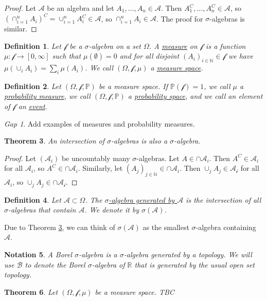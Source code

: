 \documentclass[11pt]{article}
\newcommand{\col}[1]{\mathscr{#1}}
\newcommand{\p}{\mathbb{P}}
\newcommand{\bor}{\col{B}}
\newcommand{\defname}[1]{\underline{#1}}
\newcommand{\NN}{\mathbb{N}}
\newcommand{\RR}{\mathbb{R}}
\theoremstyle{theorem}
\newtheorem{theorem}{Theorem}[section]
\newtheorem{definition}[theorem]{Definition}
\newtheorem{notation}[theorem]{Notation}
\theoremstyle{remark}
\theoremstyle{step}
\theoremstyle{gap}
\newtheorem*{gap}{Gap}
\begin{document}
\begin{proof}
Let \(\col{A}\) be an algebra and let \(A_1, \ldots, A_n \in \col{A}\). Then \(A_1^C, \ldots, A_n^C \in \col{A}\), so \(\left(\cap_{i=1}^n A_i\right)^C = \cup_{i=1}^n A_i^C \in \col{A}\), so \(\cap_{i=1}^n A_i \in \col{A}\). The proof for \(\sigma\)-algebras is similar.
\end{proof}

\begin{definition}
Let \(\col{f}\) be a \(\sigma\)-algebra on a set \(\Omega\). A \defname{measure} on \(\col{f}\) is a function \(\mu:\col{f} \to [0, \infty]\) such that \(\mu(\emptyset) = 0\) and for all disjoint \(\left(A_i\right)_{i\in \NN} \in \col{f}\) we have \(\mu\left(\cup_i A_i\right) = \sum_i \mu\left(A_i\right)\). We call \((\Omega, \col{f}, \mu)\) a \defname{measure space}.
\end{definition}

\begin{definition}
Let \((\Omega, \col{f}, \p)\) be a measure space. If \(\p(\col{f}) = 1\), we call \(\mu\) a \defname{probability measure}, we call \((\Omega, \col{f}, \p)\) a \defname{probability space}, and we call an element of \(\col{f}\) an \defname{event}.
\end{definition}

\begin{gap}
Add examples of measures and probability measures.
\end{gap}

\begin{theorem}\label{thm.intersection-algebras}
An intersection of \(\sigma\)-algebras is also a \(\sigma\)-algebra.
\end{theorem}

\begin{proof}
Let \((\col{A}_i)\) be uncountably many \(\sigma\)-algebras. Let \(A \in \cap \col{A}_i\). Then \(A^C \in \col{A}_i\) for all \(\col{A}_i\), so \(A^C \in \cap \col{A}_i\). Similarly, let \((A_j)_{j \in \NN} \in \cap \col{A}_i\). Then \(\cup_j A_j \in \col{A_i}\) for all \(\col{A}_i\), so \(\cup_j A_j \in \cap \col{A_i}\).
\end{proof}

\begin{definition}
Let \(\col{A} \subset \Omega\). The \defname{\(\sigma\)-algebra generated by \(\col{A}\)} is the intersection of all \(\sigma\)-algebras that contain \(\col{A}\). We denote it by \(\sigma(\col{A})\).
\end{definition}

Due to Theorem \ref{thm.intersection-algebras}, we can think of \(\sigma(\col{A})\) as the smallest \(\sigma\)-algebra containing \(\col{A}\).

\begin{notation}
A Borel \(\sigma\)-algebra is a \(\sigma\)-algebra generated by a topology. We will use \(\bor\) to denote the Borel \(\sigma\)-algebra of \(\RR\) that is generated by the usual open set topology.
\end{notation}

\begin{theorem}
Let \((\Omega, \col{f}, \mu)\) be a measure space. TBC
\end{theorem}
\end{document}

